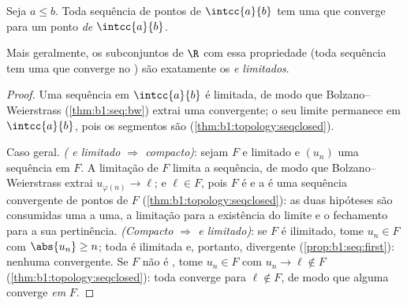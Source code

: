 \begin{theorem}\label{thm:b1:topology:compact}
Seja $a \leq b$. Toda sequência de pontos de $\intcc{a}{b}$ tem uma
 que converge para um ponto \emph{de}
$\intcc{a}{b}$.

Mais geralmente, os subconjuntos de $\R$ com essa propriedade (toda
sequência tem uma  que converge no ) são exatamente
os  \emph{ e limitados}.
\end{theorem}

\begin{proof}
Uma sequência em $\intcc{a}{b}$ é limitada, de modo que
Bolzano--Weierstrass (\cref{thm:b1:seq:bw}) extrai uma 
convergente; o seu limite permanece em $\intcc{a}{b}$, pois os segmentos
são  (\cref{thm:b1:topology:seqclosed}).

Caso geral. \emph{( e limitado $\Rightarrow$ compacto)}: sejam
$F$  e limitado e $(u_n)$ uma sequência em $F$.
A limitação de $F$ limita a sequência, de modo que
Bolzano--Weierstrass extrai $u_{\varphi(n)} \to \ell$; e $\ell \in F$, pois $F$
é  e a  é uma sequência convergente de pontos
de $F$ (\cref{thm:b1:topology:seqclosed}): as duas hipóteses são
consumidas uma a uma, a limitação para a existência do limite e o
fechamento para a sua pertinência. \emph{(Compacto $\Rightarrow$  e
limitado)}: se $F$ é ilimitado, tome $u_n \in F$ com $\abs{u_n} \geq
n$; toda  é ilimitada e, portanto, divergente
(\cref{prop:b1:seq:first}): nenhuma  convergente. Se $F$
não é , tome $u_n \in F$ com $u_n \to \ell \notin F$
(\cref{thm:b1:topology:seqclosed}): toda  converge para
$\ell \notin F$, de modo que  alguma converge \emph{em} $F$.
\end{proof}

